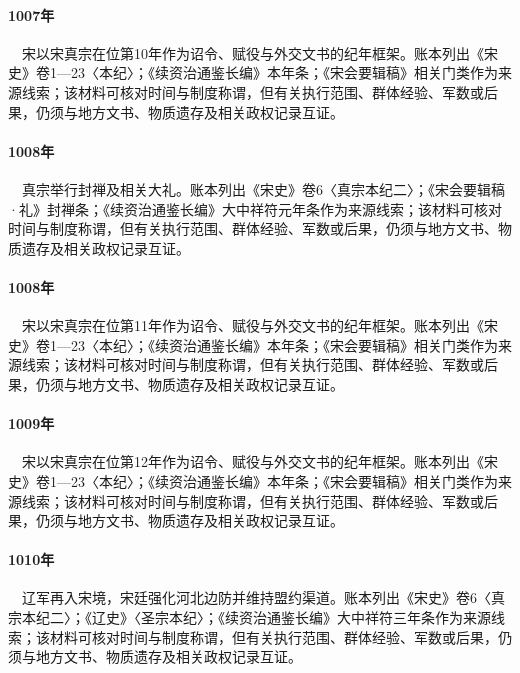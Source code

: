 \paragraph{1007年}　宋以宋真宗在位第10年作为诏令、赋役与外交文书的纪年框架。账本列出《宋史》卷1—23〈本纪〉；《续资治通鉴长编》本年条；《宋会要辑稿》相关门类作为来源线索；该材料可核对时间与制度称谓，但有关执行范围、群体经验、军数或后果，仍须与地方文书、物质遗存及相关政权记录互证。

\paragraph{1008年}　真宗举行封禅及相关大礼。账本列出《宋史》卷6〈真宗本纪二〉；《宋会要辑稿·礼》封禅条；《续资治通鉴长编》大中祥符元年条作为来源线索；该材料可核对时间与制度称谓，但有关执行范围、群体经验、军数或后果，仍须与地方文书、物质遗存及相关政权记录互证。

\paragraph{1008年}　宋以宋真宗在位第11年作为诏令、赋役与外交文书的纪年框架。账本列出《宋史》卷1—23〈本纪〉；《续资治通鉴长编》本年条；《宋会要辑稿》相关门类作为来源线索；该材料可核对时间与制度称谓，但有关执行范围、群体经验、军数或后果，仍须与地方文书、物质遗存及相关政权记录互证。

\paragraph{1009年}　宋以宋真宗在位第12年作为诏令、赋役与外交文书的纪年框架。账本列出《宋史》卷1—23〈本纪〉；《续资治通鉴长编》本年条；《宋会要辑稿》相关门类作为来源线索；该材料可核对时间与制度称谓，但有关执行范围、群体经验、军数或后果，仍须与地方文书、物质遗存及相关政权记录互证。

\paragraph{1010年}　辽军再入宋境，宋廷强化河北边防并维持盟约渠道。账本列出《宋史》卷6〈真宗本纪二〉；《辽史》〈圣宗本纪〉；《续资治通鉴长编》大中祥符三年条作为来源线索；该材料可核对时间与制度称谓，但有关执行范围、群体经验、军数或后果，仍须与地方文书、物质遗存及相关政权记录互证。

